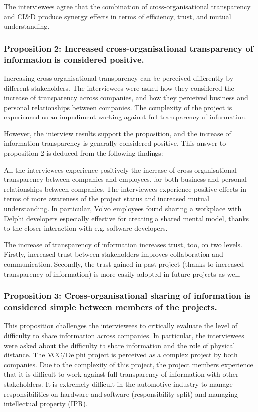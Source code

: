  The interviewees agree that the combination of cross-organisational transparency and CI\&D produce synergy effects in terms of efficiency, trust, and mutual understanding.

\subsubsection{Proposition 2: Increased cross-organisational transparency of information is considered positive.}

Increasing cross-organisational transparency can be perceived differently by different stakeholders. The interviewees were asked how they considered the increase of transparency across companies, and how they perceived business and personal relationships between companies. The complexity of the project is experienced as an impediment working against full transparency of information.

However, the interview results support the proposition, and the increase of information transparency is generally considered positive. This answer to proposition 2 is deduced from the following findings:

 All the interviewees experience positively the increase of cross-organisational transparency between companies and employees, for both business and personal relationships between companies. The interviewees experience positive effects in terms of more awareness of the project status and increased mutual understanding. In particular, Volvo employees found sharing a workplace with Delphi developers especially effective for creating a shared mental model, thanks to the closer interaction with e.g. software developers.

 The increase of transparency of information increases trust, too, on two levels. Firstly, increased trust between stakeholders improves collaboration and communication. Secondly, the trust gained in past project (thanks to increased transparency of information) is more easily adopted in future projects as well. 

\subsubsection{Proposition 3: Cross-organisational sharing of information is considered simple between members of the projects.}

This proposition challenges the interviewees to critically evaluate the level of difficulty to share information across companies. In particular, the interviewees were asked about the difficulty to share information and the role of physical distance. The VCC/Delphi project is perceived as a complex project by both companies. Due to the complexity of this project, the project members experience that it is difficult to work against full transparency of information with other stakeholders. It is extremely difficult in the automotive industry to manage responsibilities on hardware and software (responsibility split) and managing intellectual property (IPR).

